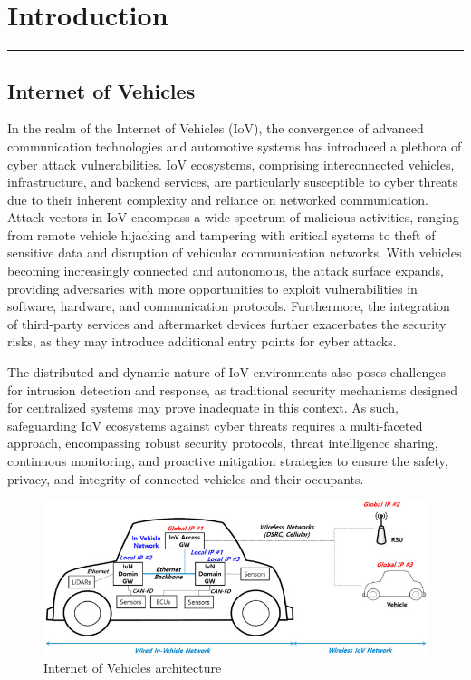 \chapter{Introduction}
\hrule
\vspace{.5cm}



\section{Internet of Vehicles}
{
In the realm of the Internet of Vehicles (IoV), the convergence of advanced communication technologies and automotive systems has introduced a plethora of cyber attack vulnerabilities. IoV ecosystems, comprising interconnected vehicles, infrastructure, and backend services, are particularly susceptible to cyber threats due to their inherent complexity and reliance on networked communication. Attack vectors in IoV encompass a wide spectrum of malicious activities, ranging from remote vehicle hijacking and tampering with critical systems to theft of sensitive data and disruption of vehicular communication networks. With vehicles becoming increasingly connected and autonomous, the attack surface expands, providing adversaries with more opportunities to exploit vulnerabilities in software, hardware, and communication protocols. Furthermore, the integration of third-party services and aftermarket devices further exacerbates the security risks, as they may introduce additional entry points for cyber attacks. 

The distributed and dynamic nature of IoV environments also poses challenges for intrusion detection and response, as traditional security mechanisms designed for centralized systems may prove inadequate in this context. As such, safeguarding IoV ecosystems against cyber threats requires a multi-faceted approach, encompassing robust security protocols, threat intelligence sharing, continuous monitoring, and proactive mitigation strategies to ensure the safety, privacy, and integrity of connected vehicles and their occupants.

\begin{figure}[htbp]
\centerline{\includegraphics[width=0.7 \textwidth]
{img/iov_f.jpg}}
\caption{Internet of Vehicles architecture}
\label{fig}
\end{figure}

}
